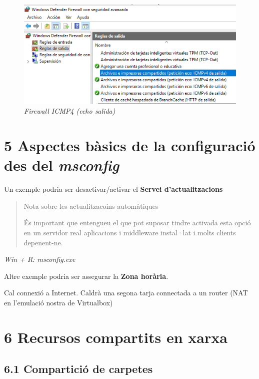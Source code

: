 \documentclass[
  a4paper,
]{article}
\begin{document}
\begin{figure}
\centering
\includegraphics{png/ADDS/FirewallICMP4Salida.png}
\caption{\emph{Firewall ICMP4 (echo salida)}}
\end{figure}

\section{\texorpdfstring{5 Aspectes bàsics de la configuració des del
\emph{msconfig}}{5 Aspectes bàsics de la configuració des del msconfig}}\label{aspectes-buxe0sics-de-la-configuraciuxf3-des-del-msconfig}

Un exemple podria ser desactivar/activar el \textbf{Servei
d'actualitzacions}

\begin{quote}
Nota sobre les actualitzacoins automàtiques

És important que entengueu el que pot suposar tindre activada esta opció
en un servidor real aplicacions i middleware instal·lat i molts clients
depenent-ne.
\end{quote}

\emph{Win + R: msconfig.exe}

Altre exemple podria ser assegurar la \textbf{Zona horària}.

Cal connexió a Internet. Caldrà una segona tarja connectada a un router
(NAT en l'emulació nostra de Virtualbox)

\section{6 Recursos compartits en
xarxa}\label{recursos-compartits-en-xarxa}

\subsection{6.1 Compartició de
carpetes}\label{comparticiuxf3-de-carpetes}
\end{document}
